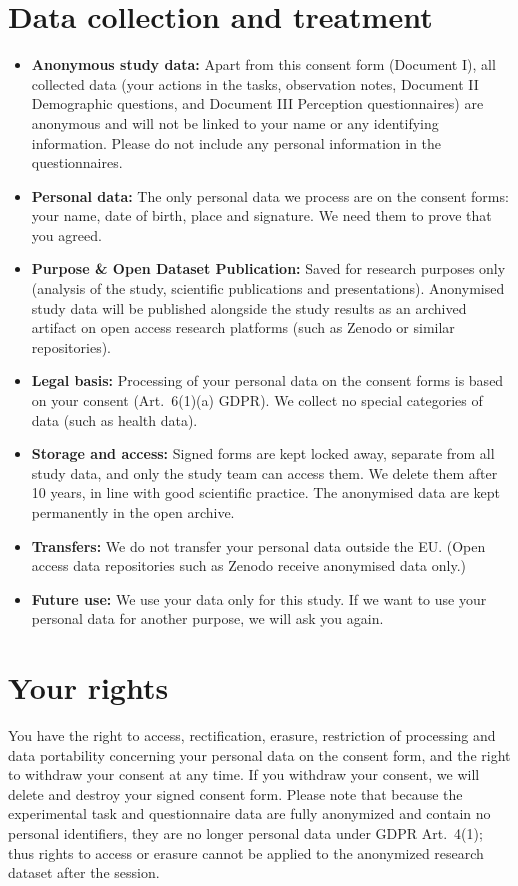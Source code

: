 \section{Data collection and treatment}
\begin{itemize}[leftmargin=1.5em, itemsep=0pt, parsep=0pt, topsep=2pt]
  \item \textbf{Anonymous study data:} Apart from this consent form (Document I), all collected data (your actions in the tasks, observation notes, Document II Demographic questions, and Document III Perception questionnaires) are anonymous and will not be linked to your name or any identifying information. Please do not include any personal information in the questionnaires.
  \item \textbf{Personal data:} The only personal data we process are on the consent forms: your name, date of birth, place and signature. We need them to prove that you agreed.
  \item \textbf{Purpose \& Open Dataset Publication:} Saved for research purposes only (analysis of the study, scientific publications and presentations). Anonymised study data will be published alongside the study results as an archived artifact on open access research platforms (such as Zenodo or similar repositories).
  \item \textbf{Legal basis:} Processing of your personal data on the consent forms is based on your consent (Art.~6(1)(a) GDPR). We collect no special categories of data (such as health data).
  \item \textbf{Storage and access:} Signed forms are kept locked away, separate from all study data, and only the study team can access them. We delete them after 10 years, in line with good scientific practice. The anonymised data are kept permanently in the open archive.
  \item \textbf{Transfers:} We do not transfer your personal data outside the EU. (Open access data repositories such as Zenodo receive anonymised data only.)
  \item \textbf{Future use:} We use your data only for this study. If we want to use your personal data for another purpose, we will ask you again.
\end{itemize}

\section{Your rights}
You have the right to access, rectification, erasure, restriction of processing and data portability concerning your personal data on the consent form, and the right to withdraw your consent at any time. If you withdraw your consent, we will delete and destroy your signed consent form. Please note that because the experimental task and questionnaire data are fully anonymized and contain no personal identifiers, they are no longer personal data under GDPR Art.~4(1); thus rights to access or erasure cannot be applied to the anonymized research dataset after the session.

